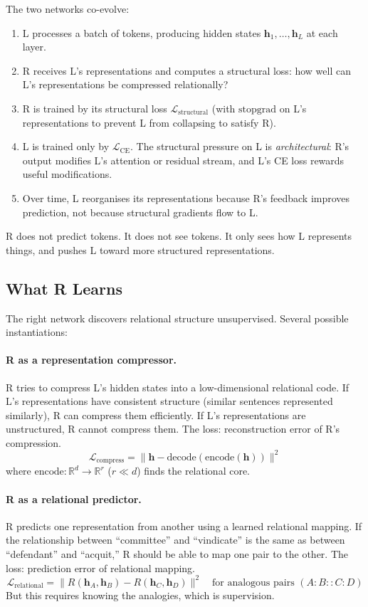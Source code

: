 \documentclass[11pt, a4paper]{article}
\newcommand{\h}{\mathbf{h}}
\newcommand{\R}{\mathbb{R}}
\theoremstyle{plain}
\theoremstyle{definition}
\theoremstyle{remark}
\begin{document}
The two networks co-evolve:
\begin{enumerate}[nosep]
\item L processes a batch of tokens, producing hidden states $\h_1, \ldots, \h_L$ at each layer.
\item R receives L's representations and computes a structural loss: how well can L's representations be compressed relationally?
\item R is trained by its structural loss $\mathcal{L}_{\mathrm{structural}}$ (with $\mathrm{stopgrad}$ on L's representations to prevent L from collapsing to satisfy R).
\item L is trained only by $\mathcal{L}_{\mathrm{CE}}$. The structural pressure on L is \emph{architectural}: R's output modifies L's attention or residual stream, and L's CE loss rewards useful modifications.
\item Over time, L reorganises its representations because R's feedback improves prediction, not because structural gradients flow to L.
\end{enumerate}

R does not predict tokens.
It does not see tokens.
It only sees how L represents things, and pushes L toward more structured representations.

\subsection{What R Learns}

The right network discovers relational structure unsupervised.
Several possible instantiations:

\paragraph{R as a representation compressor.}
R tries to compress L's hidden states into a low-dimensional relational code.
If L's representations have consistent structure (similar sentences represented similarly), R can compress them efficiently.
If L's representations are unstructured, R cannot compress them.
The loss: reconstruction error of R's compression.
\begin{equation}
\mathcal{L}_{\mathrm{compress}} = \| \h - \mathrm{decode}(\mathrm{encode}(\h)) \|^2
\end{equation}
where $\mathrm{encode}: \R^d \to \R^r$ ($r \ll d$) finds the relational core.

\paragraph{R as a relational predictor.}
R predicts one representation from another using a learned relational mapping.
If the relationship between ``committee'' and ``vindicate'' is the same as between ``defendant'' and ``acquit,'' R should be able to map one pair to the other.
The loss: prediction error of relational mapping.
\begin{equation}
\mathcal{L}_{\mathrm{relational}} = \| R(\h_A, \h_B) - R(\h_C, \h_D) \|^2 \quad \text{for analogous pairs $(A{:}B :: C{:}D)$}
\end{equation}
But this requires knowing the analogies, which is supervision.
\end{document}
